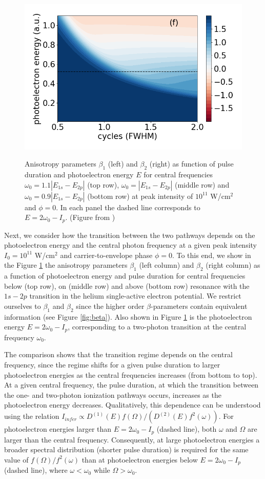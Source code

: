 \begin{figure}[!ht]
\includegraphics[width=0.40\linewidth]{figs/Photo_ionization/short_pulse/energy_d0p9_beta_2_I_1_heat.png}\\
\caption{
Anisotropy parameters $\beta_1$ (left) and $\beta_2$ (right) as function of pulse duration and photoelectron energy $E$ for central frequencies $\omega_0 = 1.1 |E_{1s}-E_{2p}|$ (top row), $\omega_0 = |E_{1s}-E_{2p}|$ (middle row) and $\omega_0 = 0.9 |E_{1s}-E_{2p}|$ (bottom row) at peak intensity of $10^{11}$ W/cm$^2$ and $\phi = 0$. In each panel the dashed line corresponds to $E = 2\omega_0 - I_p$.  (Figure from \cite{venzke2020_ionization})
} 
  \label{fig:beta_omega}
\end{figure}

Next, we consider how the transition between the two pathways depends on the photoelectron energy and the central photon frequency at a given peak intensity $I_0 = 10^{11}$ W/cm$^2$ and carrier-to-envelope phase $\phi = 0$. To this end, we show in the Figure \ref{fig:beta_omega} the 
anisotropy parameters $\beta_1$ (left column) and $\beta_2$ (right column) as a function of photoelectron energy and pulse duration for central frequencies below (top row), on (middle row) and above (bottom row) resonance with the $1s - 2p$ transition in the helium single-active electron potential. We restrict ourselves to $\beta_1$ and $\beta_2$ since the higher order $\beta$-parameters contain equivalent information (see Figure \ref{fig:beta}). Also shown in Figure \ref{fig:beta_omega} is the photoelectron energy $E = 2\omega_0 - I_p$, corresponding to a two-photon transition at the central frequency $\omega_0$. 

The comparison shows that the transition regime depends on the central frequency, since the regime shifts for a given pulse duration to larger photoelectron energies as the central frequencies increases (from bottom to top). At a given central frequency, the pulse duration, at which the transition between the one- and two-photon ionization pathways occurs, increases as the photoelectron energy decreases. Qualitatively, this dependence can be understood using the relation $I_{infer} \propto D^{(1)}(E)f(\Omega)/(D^{(2)}(E)f^2(\omega))$. For photoelectron energies larger than $E = 2\omega_0 - I_p$ (dashed line), both $\omega$ and $\Omega$ are larger than the central frequency. Consequently, at large photoelectron energies a broader spectral distribution (shorter pulse duration) is required for the same value of $f(\Omega)/f^2(\omega)$ than at photoelectron energies below $E = 2\omega_0 - I_p$ (dashed line), where $\omega < \omega_0$ while $\Omega > \omega_0$. 

